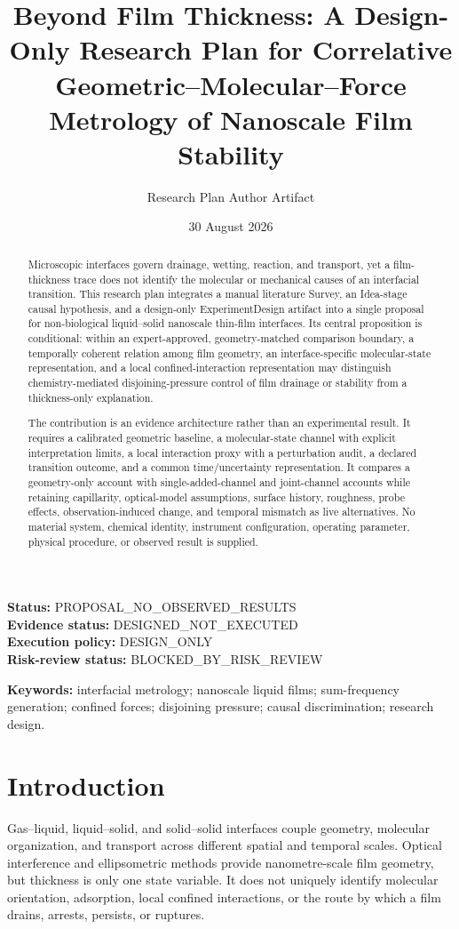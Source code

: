 \documentclass[11pt]{article}
\title{Beyond Film Thickness: A Design-Only Research Plan for Correlative Geometric--Molecular--Force Metrology of Nanoscale Film Stability}
\author{Research Plan Author Artifact}
\date{30 August 2026}
\begin{document}
\maketitle

\noindent\textbf{Status:} PROPOSAL\_NO\_OBSERVED\_RESULTS\\
\textbf{Evidence status:} DESIGNED\_NOT\_EXECUTED\\
\textbf{Execution policy:} DESIGN\_ONLY\\
\textbf{Risk-review status:} BLOCKED\_BY\_RISK\_REVIEW

\begin{abstract}
Microscopic interfaces govern drainage, wetting, reaction, and transport, yet a film-thickness trace does not identify the molecular or mechanical causes of an interfacial transition. This research plan integrates a manual literature Survey, an Idea-stage causal hypothesis, and a design-only ExperimentDesign artifact into a single proposal for non-biological liquid--solid nanoscale thin-film interfaces. Its central proposition is conditional: within an expert-approved, geometry-matched comparison boundary, a temporally coherent relation among film geometry, an interface-specific molecular-state representation, and a local confined-interaction representation may distinguish chemistry-mediated disjoining-pressure control of film drainage or stability from a thickness-only explanation.

The contribution is an evidence architecture rather than an experimental result. It requires a calibrated geometric baseline, a molecular-state channel with explicit interpretation limits, a local interaction proxy with a perturbation audit, a declared transition outcome, and a common time/uncertainty representation. It compares a geometry-only account with single-added-channel and joint-channel accounts while retaining capillarity, optical-model assumptions, surface history, roughness, probe effects, observation-induced change, and temporal mismatch as live alternatives. No material system, chemical identity, instrument configuration, operating parameter, physical procedure, or observed result is supplied.
\end{abstract}

\noindent\textbf{Keywords:} interfacial metrology; nanoscale liquid films; sum-frequency generation; confined forces; disjoining pressure; causal discrimination; research design.

\section{Introduction}
Gas--liquid, liquid--solid, and solid--solid interfaces couple geometry, molecular organization, and transport across different spatial and temporal scales. Optical interference and ellipsometric methods provide nanometre-scale film geometry, but thickness is only one state variable. It does not uniquely identify molecular orientation, adsorption, local confined interactions, or the route by which a film drains, arrests, persists, or ruptures.
\end{document}
